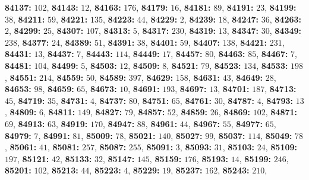 \textsf{\bfseries 84137:} $102$, \textsf{\bfseries 84143:} $12$, \textsf{\bfseries 84163:} $176$, \textsf{\bfseries 84179:} $16$, \textsf{\bfseries 84181:} $89$, \textsf{\bfseries 84191:} $23$, \textsf{\bfseries 84199:} $38$, \textsf{\bfseries 84211:} $59$, \textsf{\bfseries 84221:} $135$, \textsf{\bfseries 84223:} $44$, \textsf{\bfseries 84229:} $2$, \textsf{\bfseries 84239:} $18$, \textsf{\bfseries 84247:} $36$, \textsf{\bfseries 84263:} $2$, \textsf{\bfseries 84299:} $25$, \textsf{\bfseries 84307:} $107$, \textsf{\bfseries 84313:} $5$, \textsf{\bfseries 84317:} $230$, \textsf{\bfseries 84319:} $13$, \textsf{\bfseries 84347:} $30$, \textsf{\bfseries 84349:} $238$, \textsf{\bfseries 84377:} $24$, \textsf{\bfseries 84389:} $51$, \textsf{\bfseries 84391:} $38$, \textsf{\bfseries 84401:} $59$, \textsf{\bfseries 84407:} $138$, \textsf{\bfseries 84421:} $231$, \textsf{\bfseries 84431:} $13$, \textsf{\bfseries 84437:} $7$, \textsf{\bfseries 84443:} $114$, \textsf{\bfseries 84449:} $17$, \textsf{\bfseries 84457:} $80$, \textsf{\bfseries 84463:} $85$, \textsf{\bfseries 84467:} $7$, \textsf{\bfseries 84481:} $104$, \textsf{\bfseries 84499:} $5$, \textsf{\bfseries 84503:} $12$, \textsf{\bfseries 84509:} $8$, \textsf{\bfseries 84521:} $79$, \textsf{\bfseries 84523:} $134$, \textsf{\bfseries 84533:} $198$, \textsf{\bfseries 84551:} $214$, \textsf{\bfseries 84559:} $50$, \textsf{\bfseries 84589:} $397$, \textsf{\bfseries 84629:} $158$, \textsf{\bfseries 84631:} $43$, \textsf{\bfseries 84649:} $28$, \textsf{\bfseries 84653:} $98$, \textsf{\bfseries 84659:} $65$, \textsf{\bfseries 84673:} $10$, \textsf{\bfseries 84691:} $193$, \textsf{\bfseries 84697:} $13$, \textsf{\bfseries 84701:} $187$, \textsf{\bfseries 84713:} $45$, \textsf{\bfseries 84719:} $35$, \textsf{\bfseries 84731:} $4$, \textsf{\bfseries 84737:} $80$, \textsf{\bfseries 84751:} $65$, \textsf{\bfseries 84761:} $30$, \textsf{\bfseries 84787:} $4$, \textsf{\bfseries 84793:} $13$, \textsf{\bfseries 84809:} $6$, \textsf{\bfseries 84811:} $149$, \textsf{\bfseries 84827:} $79$, \textsf{\bfseries 84857:} $52$, \textsf{\bfseries 84859:} $26$, \textsf{\bfseries 84869:} $102$, \textsf{\bfseries 84871:} $69$, \textsf{\bfseries 84913:} $63$, \textsf{\bfseries 84919:} $170$, \textsf{\bfseries 84947:} $88$, \textsf{\bfseries 84961:} $44$, \textsf{\bfseries 84967:} $55$, \textsf{\bfseries 84977:} $65$, \textsf{\bfseries 84979:} $7$, \textsf{\bfseries 84991:} $81$, \textsf{\bfseries 85009:} $78$, \textsf{\bfseries 85021:} $140$, \textsf{\bfseries 85027:} $99$, \textsf{\bfseries 85037:} $114$, \textsf{\bfseries 85049:} $78$, \textsf{\bfseries 85061:} $41$, \textsf{\bfseries 85081:} $257$, \textsf{\bfseries 85087:} $255$, \textsf{\bfseries 85091:} $3$, \textsf{\bfseries 85093:} $31$, \textsf{\bfseries 85103:} $24$, \textsf{\bfseries 85109:} $197$, \textsf{\bfseries 85121:} $42$, \textsf{\bfseries 85133:} $32$, \textsf{\bfseries 85147:} $145$, \textsf{\bfseries 85159:} $176$, \textsf{\bfseries 85193:} $14$, \textsf{\bfseries 85199:} $246$, \textsf{\bfseries 85201:} $102$, \textsf{\bfseries 85213:} $44$, \textsf{\bfseries 85223:} $4$, \textsf{\bfseries 85229:} $19$, \textsf{\bfseries 85237:} $162$, \textsf{\bfseries 85243:} $210$, 
